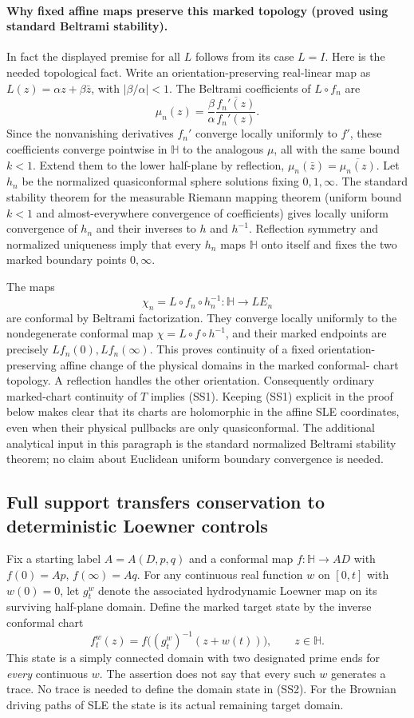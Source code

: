 \documentclass[11pt]{article}
\theoremstyle{definition}\newtheorem{definition}[theorem]{Definition}
\theoremstyle{remark}\newtheorem{remark}[theorem]{Remark}
\begin{document}
\paragraph{Why fixed affine maps preserve this marked topology (proved using
standard Beltrami stability).}
In fact the displayed premise for all $L$ follows from its case $L=I$.
Here is the needed topological fact.  Write an orientation-preserving
real-linear map as $L(z)=\alpha z+\beta\bar z$, with
$|\beta/\alpha|<1$.  The Beltrami coefficients of $L\circ f_n$ are
\[
 \mu_n(z)=\frac{\beta}{\alpha}
             \frac{\overline{f_n'(z)}}{f_n'(z)}.
\]
Since the nonvanishing derivatives $f_n'$ converge locally uniformly to
$f'$, these coefficients converge pointwise in $\mathbb H$ to the analogous
$\mu$, all with the same bound $k<1$.  Extend them to the lower half-plane
by reflection, $\mu_n(\bar z)=\overline{\mu_n(z)}$.  Let $h_n$ be the
normalized quasiconformal sphere solutions fixing $0,1,\infty$.
The standard stability theorem for the measurable Riemann mapping theorem
(uniform bound $k<1$ and almost-everywhere convergence of coefficients)
gives locally uniform convergence of $h_n$ and their inverses to $h$ and
$h^{-1}$.  Reflection symmetry and normalized uniqueness imply that every
$h_n$ maps $\mathbb H$ onto itself and fixes the two marked boundary points
$0,\infty$.

The maps
\[
 \chi_n=L\circ f_n\circ h_n^{-1}:\mathbb H\longrightarrow LE_n
\]
are conformal by Beltrami factorization.  They converge locally uniformly
to the nondegenerate conformal map
$\chi=L\circ f\circ h^{-1}$, and their marked endpoints are precisely
$Lf_n(0),Lf_n(\infty)$.  This proves continuity of a fixed orientation-
preserving affine change of the physical domains in the marked conformal-
chart topology.  A reflection handles the other orientation.
Consequently ordinary marked-chart continuity of $T$ implies (SS1).
Keeping (SS1) explicit in the proof below makes clear that its charts are
holomorphic in the affine SLE coordinates, even when their physical pullbacks
are only quasiconformal.  The additional analytical input in this paragraph
is the standard normalized Beltrami stability theorem; no claim about
Euclidean uniform boundary convergence is needed.

\subsection{Full support transfers conservation to deterministic Loewner controls}

Fix a starting label $A=A(D,p,q)$ and a conformal map
$f:\mathbb H\to AD$ with $f(0)=Ap$, $f(\infty)=Aq$.  For any continuous
real function $w$ on $[0,t]$ with $w(0)=0$, let $g_t^w$ denote the associated
hydrodynamic Loewner map on its surviving half-plane domain.  Define the
marked target state by the inverse conformal chart
\[
 f_t^w(z)=f\bigl((g_t^w)^{-1}(z+w(t))\bigr),\qquad z\in\mathbb H.
 \tag{SS2}
\]
This state is a simply connected domain with two designated prime ends for
\emph{every} continuous $w$.  The assertion does not say that every such
$w$ generates a trace.  No trace is needed to define the domain state in
(SS2).  For the Brownian driving paths of SLE the state is its actual
remaining target domain.
\end{document}
